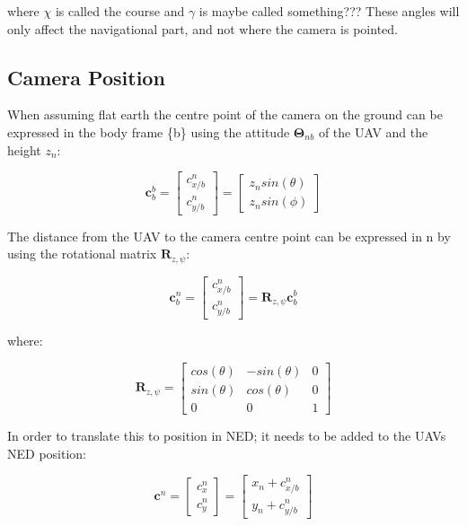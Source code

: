 where $\chi$ is called the course and $\gamma$ is maybe called something??? These angles will only affect the navigational part, and not where the camera is pointed.


\subsection{Camera Position}



When assuming flat earth the centre point of the camera on the ground can be expressed in the body frame \{b\} using the attitude $\bm{\Theta}_{nb}$ of the UAV and the height $z_n$:

\begin{equation} \label{eq:camera_pos}
	\bm{c}_b^b =
	\begin{bmatrix}
		c_{x/b}^n \\
		c_{y/b}^n
	\end{bmatrix}
	=
	\begin{bmatrix}
		z_n sin(\theta) \\
		z_n sin(\phi)
	\end{bmatrix}
\end{equation}

The distance from the UAV to the camera centre point can be expressed in {n} by using the rotational matrix $\bm{R}_{z,\psi}$:

\begin{equation} \label{eq:body_ned_rotate}
	\bm{c}_b^n =
	\begin{bmatrix}
		c_{x/b}^n \\
		c_{y/b}^n
	\end{bmatrix}
	= \bm{R}_{z,\psi} \bm{c}_b^b
\end{equation}

where:

\begin{equation}
	\bm{R}_{z,\psi} = 
	\begin{bmatrix}
		cos(\theta) & -sin(\theta) & 0 \\
		sin(\theta) & cos(\theta) & 0 \\
		0 & 0 & 1
	\end{bmatrix}
\end{equation}
	

In order to translate this to position in NED; it needs to be added to the UAVs NED position:

\begin{equation} \label{eq:body_ned_trans}
	\bm{c}^n =
	\begin{bmatrix}
		c_x^n \\ c_y^n
	\end{bmatrix}
	=
	\begin{bmatrix}
		x_n + c_{x/b}^n \\
		y_n + c_{y/b}^n
	\end{bmatrix}
\end{equation}


